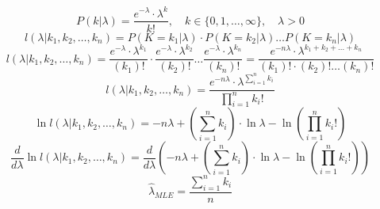 $$P(k|\lambda) = \frac{e^{-\lambda} \cdot \lambda^k}{k!} , \quad k \in \{0, 1, \dots, \infty\}, \quad \lambda > 0$$
$$l(\lambda | k_1, k_2, \dots, k_n) = P(K=k_1 | \lambda) \cdot P(K=k_2 | \lambda) \dots P(K=k_n | \lambda)$$
$$l(\lambda | k_1, k_2, \dots, k_n) = \frac{e^{-\lambda} \cdot \lambda^{k_1}}{(k_1)!} \cdot \frac{e^{-\lambda} \cdot \lambda^{k_2}}{(k_2)!} \dots \frac{e^{-\lambda} \cdot \lambda^{k_n}}{(k_n)!} = \frac{e^{-n\lambda} \cdot \lambda^{k_1+k_2+\dots+k_n}}{(k_1)! \cdot (k_2)! \dots (k_n)!}$$
$$l(\lambda | k_1, k_2, \dots, k_n) = \frac{e^{-n\lambda} \cdot \lambda^{\sum_{i=1}^{n} k_i}}{\prod_{i=1}^{n} k_i!}$$
$$\ln l(\lambda | k_1, k_2, \dots, k_n) = -n\lambda + \left(\sum_{i=1}^{n} k_i\right) \cdot \ln \lambda - \ln \left(\prod_{i=1}^{n} k_i!\right)$$
$$\frac{d}{d\lambda} \ln l(\lambda | k_1, k_2, \dots, k_n) = \frac{d}{d\lambda} \left( -n\lambda + \left(\sum_{i=1}^{n} k_i\right) \cdot \ln \lambda - \ln \left(\prod_{i=1}^{n} k_i!\right) \right)$$
$$\hat{\lambda}_{MLE} = \frac{\sum_{i=1}^{n} k_i}{n}$$